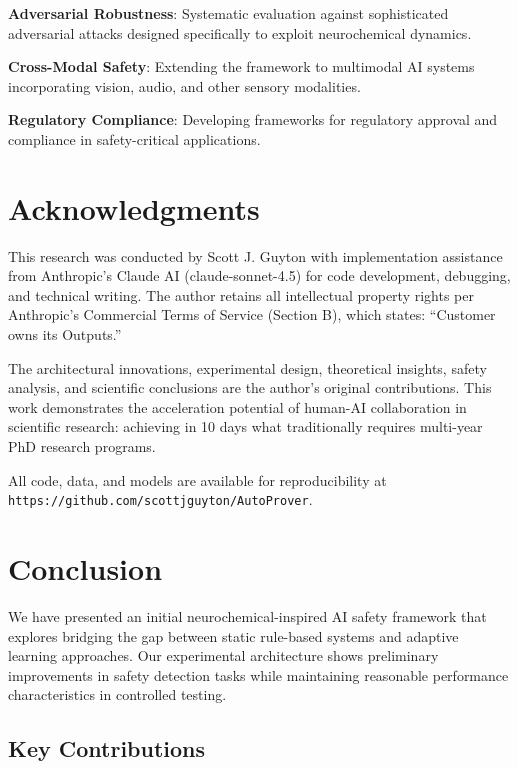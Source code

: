 \documentclass[12pt]{article}
\begin{document}
\textbf{Adversarial Robustness}: Systematic evaluation against sophisticated adversarial attacks designed specifically to exploit neurochemical dynamics.

\textbf{Cross-Modal Safety}: Extending the framework to multimodal AI systems incorporating vision, audio, and other sensory modalities.

\textbf{Regulatory Compliance}: Developing frameworks for regulatory approval and compliance in safety-critical applications.

\section*{Acknowledgments}

This research was conducted by Scott J. Guyton with implementation assistance from Anthropic's Claude AI (claude-sonnet-4.5) for code development, debugging, and technical writing. The author retains all intellectual property rights per Anthropic's Commercial Terms of Service (Section B), which states: ``Customer owns its Outputs.''

The architectural innovations, experimental design, theoretical insights, safety analysis, and scientific conclusions are the author's original contributions. This work demonstrates the acceleration potential of human-AI collaboration in scientific research: achieving in 10 days what traditionally requires multi-year PhD research programs.

All code, data, and models are available for reproducibility at \texttt{https://github.com/scottjguyton/AutoProver}.

\section{Conclusion}

We have presented an initial neurochemical-inspired AI safety framework that explores bridging the gap between static rule-based systems and adaptive learning approaches. Our experimental architecture shows preliminary improvements in safety detection tasks while maintaining reasonable performance characteristics in controlled testing.

\subsection{Key Contributions}
\end{document}

